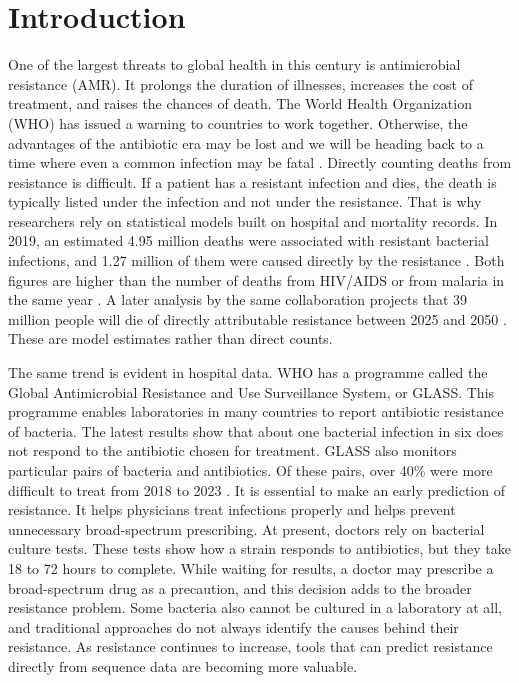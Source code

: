 \documentclass[journal]{IEEEtran}
\begin{document}
\section{Introduction}
\label{sec:intro}

One of the largest threats to global health in this century is
antimicrobial resistance (AMR). It prolongs the duration of illnesses, increases
the cost of treatment, and raises the chances of death. The World Health
Organization (WHO) has issued a warning to countries to work together. Otherwise,
the advantages of the antibiotic era may be lost and we will be heading back to a
time where even a common infection may be fatal \cite{who_amr_2019}. Directly
counting deaths from resistance is difficult. If a patient has a resistant
infection and dies, the death is typically listed under the infection and not
under the resistance. That is why researchers rely on statistical models built on
hospital and mortality records. In 2019, an estimated 4.95 million deaths were
associated with resistant bacterial infections, and 1.27 million of them were
caused directly by the resistance \cite{murray2022gram}. Both figures are higher
than the number of deaths from HIV/AIDS or from malaria in the same year
\cite{murray2022gram}. A later analysis by the same collaboration projects that
39 million people will die of directly attributable resistance between 2025 and 2050
\cite{naghavi2024forecast}. These are model estimates rather than direct counts.

The same trend is evident in hospital data. WHO has a programme called the Global
Antimicrobial Resistance and Use Surveillance System, or GLASS. This programme
enables laboratories in many countries to report antibiotic resistance of
bacteria. The latest results show that about one bacterial infection in six does
not respond to the antibiotic chosen for treatment. GLASS also monitors particular
pairs of bacteria and antibiotics. Of these pairs, over 40\% were more difficult
to treat from 2018 to 2023 \cite{who2025glass}. It is essential to make an early
prediction of resistance. It helps physicians treat infections properly and helps
prevent unnecessary broad-spectrum prescribing. At present, doctors rely on
bacterial culture tests. These tests show how a strain responds to antibiotics,
but they take 18 to 72 hours to complete. While waiting for results, a doctor may
prescribe a broad-spectrum drug as a precaution, and this decision adds to the
broader resistance problem. Some bacteria also cannot be cultured in a laboratory
at all, and traditional approaches do not always identify the causes behind their
resistance. As resistance continues to increase, tools that can predict resistance
directly from sequence data are becoming more valuable.
\end{document}

